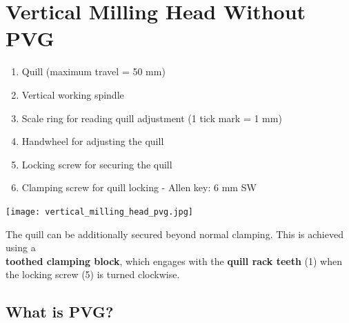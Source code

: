 
\section{Vertical Milling Head Without PVG}

\begin{minipage}{0.5\textwidth}
    \begin{enumerate}[itemsep=1pt,parsep=0pt]
        \item Quill (maximum travel = 50 mm)
        \item Vertical working spindle
        \item Scale ring for reading quill adjustment (1 tick mark = 1 mm)
        \item Handwheel for adjusting the quill
        \item Locking screw for securing the quill
        \item Clamping screw for quill locking - Allen key: 6 mm SW
    \end{enumerate}
\end{minipage}%
\begin{minipage}{0.5\textwidth}
    \centering
    \texttt{[image: vertical\_milling\_head\_pvg.jpg]}
\end{minipage}

\vspace{0.5cm}

\noindent The quill can be additionally secured beyond normal clamping.  
This is achieved using a\\ \textbf{toothed clamping block}, which engages with the \textbf{quill rack teeth} (1) when the locking screw (5) is turned clockwise.

\vspace{0.3cm}


\vspace{0.3cm}


\vspace{0.5cm}

\subsection{What is PVG?}

